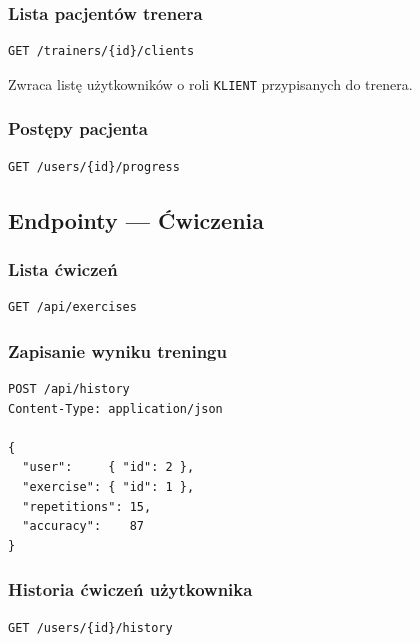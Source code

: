 \documentclass[12pt,a4paper]{article}
\begin{document}
\subsubsection{Lista pacjentów trenera}
\begin{lstlisting}[caption={GET /trainers/\{id\}/clients}]
GET /trainers/{id}/clients
\end{lstlisting}
Zwraca listę użytkowników o roli \texttt{KLIENT} przypisanych do trenera.

\subsubsection{Postępy pacjenta}
\begin{lstlisting}[caption={GET /users/\{id\}/progress}]
GET /users/{id}/progress
\end{lstlisting}

\subsection{Endpointy --- Ćwiczenia}

\subsubsection{Lista ćwiczeń}
\begin{lstlisting}[caption={GET /api/exercises}]
GET /api/exercises
\end{lstlisting}

\subsubsection{Zapisanie wyniku treningu}
\begin{lstlisting}[caption={POST /api/history}]
POST /api/history
Content-Type: application/json

{
  "user":     { "id": 2 },
  "exercise": { "id": 1 },
  "repetitions": 15,
  "accuracy":    87
}
\end{lstlisting}

\subsubsection{Historia ćwiczeń użytkownika}
\begin{lstlisting}[caption={GET /users/\{id\}/history}]
GET /users/{id}/history
\end{lstlisting}

\end{document}
